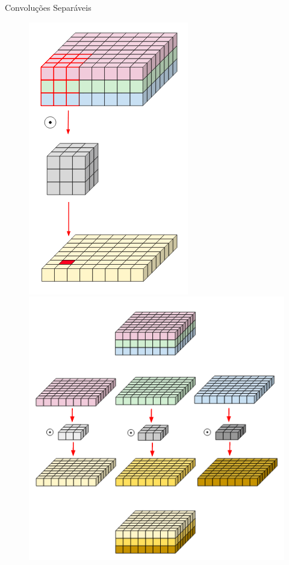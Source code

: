 \documentclass[10pt, compress]{beamer}
\begin{document}
\begin{frame}{Convoluções Separáveis}
\begin{figure}
\centering
\includegraphics[scale=0.25]{images/conv1.png} \hfil
\includegraphics[scale=0.25]{images/conv2.png} \hfil

\end{figure}
\end{frame}
\end{document}
